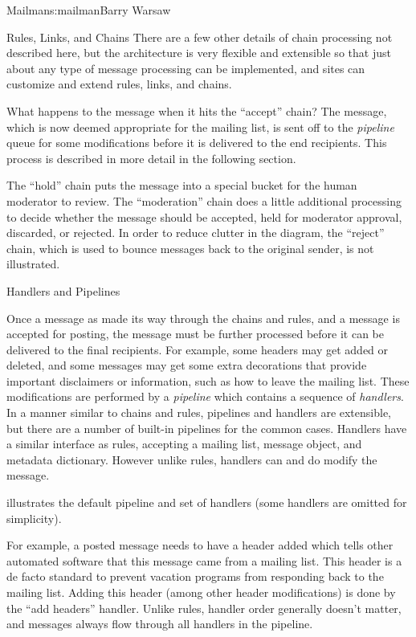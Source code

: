 \begin{aosachapter}{Mailman}{s:mailman}{Barry Warsaw}
\begin{aosasect1}{Rules, Links, and Chains}
There are a few other details of chain processing not described here,
but the architecture is very flexible and extensible so that just
about any type of message processing can be implemented, and sites can
customize and extend rules, links, and chains.

What happens to the message when it hits the ``accept'' chain?  The
message, which is now deemed appropriate for the mailing list, is sent
off to the \emph{pipeline} queue for some modifications before it is
delivered to the end recipients.  This process is described in more
detail in the following section.

The ``hold'' chain puts the message into a special bucket for the
human moderator to review.  The ``moderation'' chain does a little
additional processing to decide whether the message should be
accepted, held for moderator approval, discarded, or rejected.  In
order to reduce clutter in the diagram, the ``reject'' chain, which is
used to bounce messages back to the original sender, is not
illustrated.

\end{aosasect1}

\begin{aosasect1}{Handlers and Pipelines}

Once a message as made its way through the chains and rules, and a
message is accepted for posting, the message must be further processed
before it can be delivered to the final recipients.  For example, some
headers may get added or deleted, and some messages may get some extra
decorations that provide important disclaimers or information, such as
how to leave the mailing list.  These modifications are performed by a
\emph{pipeline} which contains a sequence of \emph{handlers}.  In a
manner similar to chains and rules, pipelines and handlers are
extensible, but there are a number of built-in pipelines for the
common cases.  Handlers have a similar interface as rules, accepting a
mailing list, message object, and metadata dictionary.  However unlike
rules, handlers can and do modify the message.

 illustrates the default pipeline and
set of handlers (some handlers are omitted for simplicity).


For example, a posted message needs to have a 
header added which tells other automated software that this message
came from a mailing list.  This header is a de facto standard to
prevent vacation programs from responding back to the mailing list.
Adding this header (among other header modifications) is done by the
``add headers'' handler.  Unlike rules, handler order generally
doesn't matter, and messages always flow through all handlers in the
pipeline.


\end{aosasect1}
\end{aosachapter}
